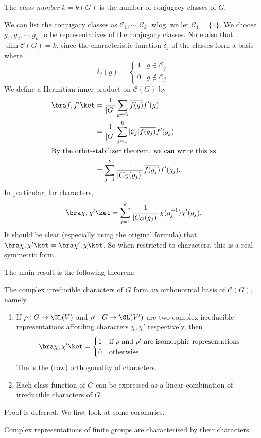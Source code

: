 \documentclass[a4paper]{article}
\begin{document}
\begin{defi}
  The \emph{class number} $k = k(G)$ is the number of conjugacy classes of $G$.
\end{defi}
We can list the conjugacy classes as $\mathcal{C}_1, \cdots, \mathcal{C}_k$. wlog, we let $\mathcal{C}_1 = \{1\}$. We choose $g_1, g_2, \cdots, g_k$ to be representatives of the conjugacy classes. Note also that $\dim \mathcal{C}(G) = k$, since the characteristic function $\delta_j$ of the classes form a basis where
\[
  \delta_j(g) =
  \begin{cases}
    1 & g \in \mathcal{C}_j\\
    0 & g \not\in \mathcal{C}_j.
  \end{cases}
\]
We define a Hermitian inner product on $\mathcal{C}(G)$ by
\begin{align*}
  \bra f, f'\ket &= \frac{1}{|G|} \sum_{g \in G}\overline{f(g)} f'(g) \\
  &= \frac{1}{|G|} \sum_{j = 1}^k |\mathcal{C}_j|\overline{f(g_j)} f'(g_j)\\
  \intertext{By the orbit-stabilizer theorem, we can write this as}
  &= \sum_{j = 1}^k \frac{1}{|C_G(g_j)|} \overline{f(g_j)} f'(g_j).
\end{align*}
In particular, for characters,
\[
  \bra \chi, \chi'\ket = \sum_{j = 1}^k \frac{1}{|C_G(g_j)|} \chi(g_j^{-1}) \chi'(g_j).
\]
It should be clear (especially using the original formula) that $\bra \chi, \chi'\ket = \bra \chi', \chi\ket$. So when restricted to characters, this is a real symmetric form.

The main result is the following theorem:
\begin{thm}
  The complex irreducible characters of $G$ form an orthonormal basis of $\mathcal{C}(G)$, namely
  \begin{enumerate}
    \item If $\rho: G \to \GL(V)$ and $\rho': G \to \GL(V')$ are two complex irreducible representations affording characters $\chi, \chi'$ respectively, then
      \[
        \bra \chi, \chi'\ket =
        \begin{cases}
          1 & \text{if $\rho$ and $\rho'$ are isomorphic representations}\\
          0 & \text{otherwise}
        \end{cases}
      \]
      The is the (row) orthogonality of characters.
    \item Each class function of $G$ can be expressed as a linear combination of irreducible characters of $G$.
  \end{enumerate}
\end{thm}
Proof is deferred. We first look at some corollaries.
\begin{cor}
  Complex representations of finite groups are characterised by their characters.
\end{cor}
\end{document}
